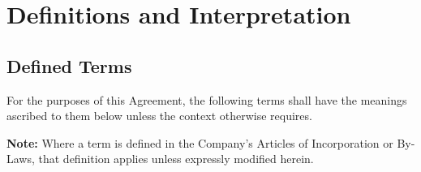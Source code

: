 
\section{Definitions and Interpretation}
\label{sec:definitions}

\subsection{Defined Terms}

For the purposes of this Agreement, the following terms shall have the meanings
ascribed to them below unless the context otherwise requires.

\begin{tcolorbox}[notebox]
  \small
  \textbf{Note:} Where a term is defined in the Company's Articles of
  Incorporation or By-Laws, that definition applies unless expressly modified
  herein.
\end{tcolorbox}

\medskip

